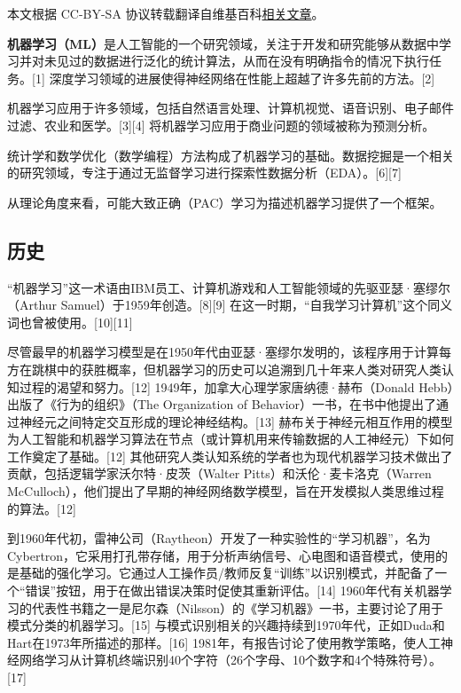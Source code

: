 
本文根据 CC-BY-SA 协议转载翻译自维基百科\href{https://en.wikipedia.org/wiki/Machine_learning}{相关文章}。

\textbf{机器学习（ML）}是人工智能的一个研究领域，关注于开发和研究能够从数据中学习并对未见过的数据进行泛化的统计算法，从而在没有明确指令的情况下执行任务。[1] 深度学习领域的进展使得神经网络在性能上超越了许多先前的方法。[2]

机器学习应用于许多领域，包括自然语言处理、计算机视觉、语音识别、电子邮件过滤、农业和医学。[3][4] 将机器学习应用于商业问题的领域被称为预测分析。

统计学和数学优化（数学编程）方法构成了机器学习的基础。数据挖掘是一个相关的研究领域，专注于通过无监督学习进行探索性数据分析（EDA）。[6][7]

从理论角度来看，可能大致正确（PAC）学习为描述机器学习提供了一个框架。
\subsection{历史}  
“机器学习”这一术语由IBM员工、计算机游戏和人工智能领域的先驱亚瑟·塞缪尔（Arthur Samuel）于1959年创造。[8][9] 在这一时期，“自我学习计算机”这个同义词也曾被使用。[10][11]

尽管最早的机器学习模型是在1950年代由亚瑟·塞缪尔发明的，该程序用于计算每方在跳棋中的获胜概率，但机器学习的历史可以追溯到几十年来人类对研究人类认知过程的渴望和努力。[12] 1949年，加拿大心理学家唐纳德·赫布（Donald Hebb）出版了《行为的组织》（The Organization of Behavior）一书，在书中他提出了通过神经元之间特定交互形成的理论神经结构。[13] 赫布关于神经元相互作用的模型为人工智能和机器学习算法在节点（或计算机用来传输数据的人工神经元）下如何工作奠定了基础。[12] 其他研究人类认知系统的学者也为现代机器学习技术做出了贡献，包括逻辑学家沃尔特·皮茨（Walter Pitts）和沃伦·麦卡洛克（Warren McCulloch），他们提出了早期的神经网络数学模型，旨在开发模拟人类思维过程的算法。[12]

到1960年代初，雷神公司（Raytheon）开发了一种实验性的“学习机器”，名为Cybertron，它采用打孔带存储，用于分析声纳信号、心电图和语音模式，使用的是基础的强化学习。它通过人工操作员/教师反复“训练”以识别模式，并配备了一个“错误”按钮，用于在做出错误决策时促使其重新评估。[14] 1960年代有关机器学习的代表性书籍之一是尼尔森（Nilsson）的《学习机器》一书，主要讨论了用于模式分类的机器学习。[15] 与模式识别相关的兴趣持续到1970年代，正如Duda和Hart在1973年所描述的那样。[16] 1981年，有报告讨论了使用教学策略，使人工神经网络学习从计算机终端识别40个字符（26个字母、10个数字和4个特殊符号）。[17]

